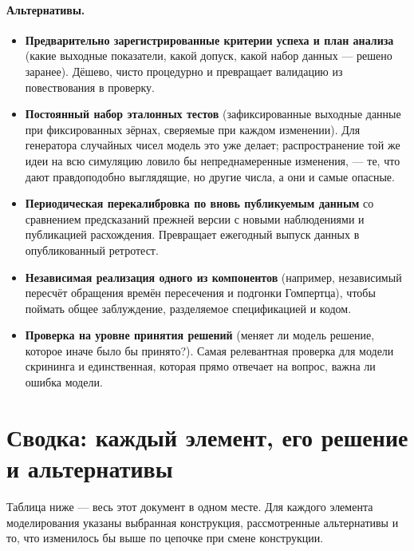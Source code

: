 \documentclass[12pt,a4paper]{article}
\newcommand{\alt}[1]{\paragraph{Альтернативы.} #1}
\begin{document}
\alt{\begin{itemize}[nosep]
  \item \textbf{Предварительно зарегистрированные критерии успеха и план анализа} (какие выходные показатели,
        какой допуск, какой набор данных --- решено заранее). Дёшево, чисто процедурно и превращает
        валидацию из повествования в проверку.
  \item \textbf{Постоянный набор эталонных тестов} (зафиксированные выходные данные при фиксированных
        зёрнах, сверяемые при каждом изменении). Для генератора случайных чисел модель это уже делает;
        распространение той же идеи на всю симуляцию ловило бы непреднамеренные изменения, --- те, что дают
        правдоподобно выглядящие, но другие числа, а они и самые опасные.
  \item \textbf{Периодическая перекалибровка по вновь публикуемым данным} со сравнением предсказаний прежней
        версии с новыми наблюдениями и публикацией расхождения. Превращает ежегодный выпуск данных в
        опубликованный ретротест.
  \item \textbf{Независимая реализация одного из компонентов} (например, независимый пересчёт обращения
        времён пересечения и подгонки Гомпертца), чтобы поймать общее заблуждение, разделяемое спецификацией
        и кодом.
  \item \textbf{Проверка на уровне принятия решений} (меняет ли модель решение, которое иначе было бы
        принято?). Самая релевантная проверка для модели скрининга и единственная, которая прямо отвечает на
        вопрос, важна ли ошибка модели.
\end{itemize}}

\section{Сводка: каждый элемент, его решение и альтернативы}

Таблица ниже --- весь этот документ в одном месте. Для каждого элемента моделирования указаны выбранная
конструкция, рассмотренные альтернативы и то, что изменилось бы выше по цепочке при смене конструкции.
\end{document}
